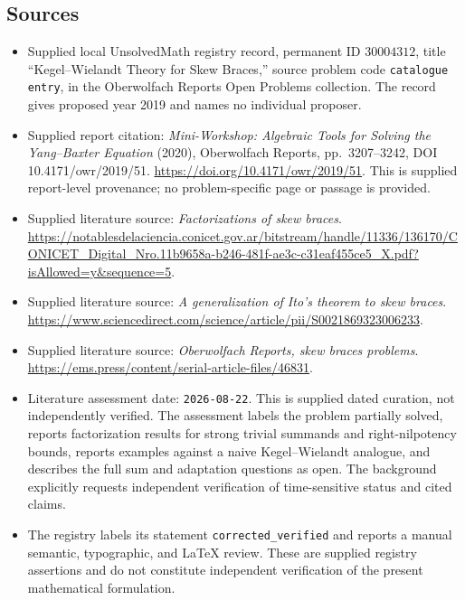 \documentclass[11pt]{article}
\begin{document}
\subsection{Sources}
\begin{itemize}
\item Supplied local UnsolvedMath registry record, permanent ID \(30004312\), title ``Kegel--Wielandt Theory for Skew Braces,'' source problem code \texttt{catalogue entry}, in the Oberwolfach Reports Open Problems collection. The record gives proposed year 2019 and names no individual proposer.
\item Supplied report citation: \emph{Mini-Workshop: Algebraic Tools for Solving the Yang--Baxter Equation} (2020), Oberwolfach Reports, pp.\ 3207--3242, DOI 10.4171/owr/2019/51. \url{https://doi.org/10.4171/owr/2019/51}. This is supplied report-level provenance; no problem-specific page or passage is provided.
\item Supplied literature source: \emph{Factorizations of skew braces}. \url{https://notablesdelaciencia.conicet.gov.ar/bitstream/handle/11336/136170/CONICET_Digital_Nro.11b9658a-b246-481f-ae3c-c31eaf455ce5_X.pdf?isAllowed=y\&sequence=5}.
\item Supplied literature source: \emph{A generalization of Ito's theorem to skew braces}. \url{https://www.sciencedirect.com/science/article/pii/S0021869323006233}.
\item Supplied literature source: \emph{Oberwolfach Reports, skew braces problems}. \url{https://ems.press/content/serial-article-files/46831}.
\item Literature assessment date: \texttt{2026-08-22}. This is supplied dated curation, not independently verified. The assessment labels the problem partially solved, reports factorization results for strong trivial summands and right-nilpotency bounds, reports examples against a naive Kegel--Wielandt analogue, and describes the full sum and adaptation questions as open. The background explicitly requests independent verification of time-sensitive status and cited claims.
\item The registry labels its statement \texttt{corrected\_verified} and reports a manual semantic, typographic, and LaTeX review. These are supplied registry assertions and do not constitute independent verification of the present mathematical formulation.
\end{itemize}
\end{document}
